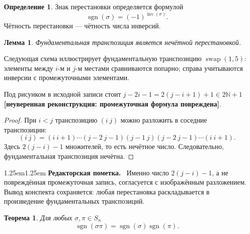 \documentclass[12pt,a4paper,oneside,openany]{book}
\theoremstyle{definition}
\newtheorem{definition}{Определение}[chapter]
\theoremstyle{plain}
\newtheorem{theorem}{Теорема}[chapter]
\newtheorem{lemma}{Лемма}[chapter]
\theoremstyle{remark}
\newenvironment{editorialnote}
  {\begin{adjustwidth}{1.25em}{1.25em}\small
   \noindent\textcolor{editorred}{\sffamily\bfseries Редакторская пометка.}\ }
  {\par\end{adjustwidth}}
\DeclareMathOperator{\inv}{inv}
\DeclareMathOperator{\sgn}{sgn}
\newcommand{\N}{\mathbb{N}}
\newcommand{\uncertain}[1]{%
  \textcolor{editorred}{\textbf{[неуверенная реконструкция: #1]}}}
\begin{document}
\begin{definition}
Знак перестановки определяется формулой
\[
  \sgn(\sigma)=(-1)^{\inv(\sigma)}.
\]
Чётность перестановки --- чётность числа инверсий.
\end{definition}

\begin{lemma}
Фундаментальная транспозиция является нечётной перестановкой.
\end{lemma}

Следующая схема иллюстрирует фундаментальную транспозицию
\(\operatorname{swap}(1,5)\):
элементы между \(i\)-м и \(j\)-м местами сравниваются попарно; справа
учитываются инверсии с промежуточными элементами.

\begin{center}
\end{center}

Под рисунком в исходной записи стоит
\(j-2i-1=2(j-i+1)+1\in2\N+1\)
\uncertain{промежуточная формула повреждена}.

\begin{proof}
При $i<j$ транспозицию $(i\ j)$ можно разложить в соседние
транспозиции:
\[
  (i\ j)
  =(i\ i+1)\cdots(j-2\ j-1)(j-1\ j)
   (j-2\ j-1)\cdots(i\ i+1).
\]
Здесь $2(j-i)-1$ множителей, то есть нечётное число. Следовательно,
фундаментальная транспозиция нечётна.
\end{proof}

\begin{editorialnote}
Именно число $2(j-i)-1$, а не повреждённая промежуточная запись,
согласуется с изображённым разложением. Вывод конспекта сохраняется:
любая перестановка раскладывается в произведение фундаментальных
транспозиций.
\end{editorialnote}



\begin{theorem}
Для любых $\sigma,\pi\in S_n$
\[
  \sgn(\sigma\pi)=\sgn(\sigma)\sgn(\pi).
\]
\end{theorem}
\end{document}

